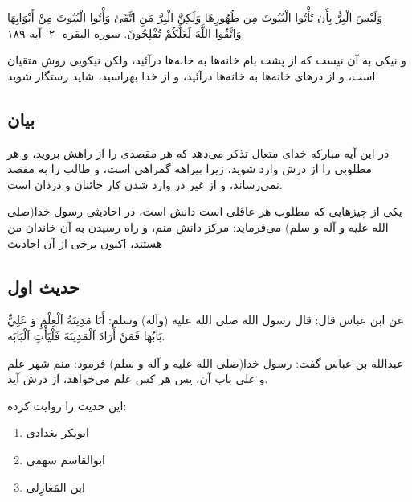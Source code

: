 وَلَيْسَ الْبِرُّ بِأَن تَأْتُوا الْبُيُوتَ مِن ظُهُورِهَا وَلَٰكِنَّ الْبِرَّ مَنِ اتَّقَىٰ وَأْتُوا الْبُيُوتَ مِنْ
أَبْوَابِهَا وَاتَّقُوا اللَّهَ لَعَلَّكُمْ تُفْلِحُونَ. سوره البقره -۲- آیه ۱۸۹.

و نیکی به آن نیست که از پشت بام خانه‌ها به خانه‌ها درآئید، ولکن نیکویی
روش متقیان است، و از درهای خانه‌ها به خانه‌ها درآئید، و از خدا بهراسید،
شاید رستگار شوید.

\subsection{بیان}

در این آیه مبارکه خدای متعال تذکر می‌دهد که هر مقصدی را از راهش بروید،
و هر مطلوبی را از درش وارد شوید، زیرا بیراهه گمراهی است، و طالب را به
مقصد نمی‌رساند، و از غیر در وارد شدن کار خائنان و دزدان است.

یکی از چیزهایی که مطلوب هر عاقلی است دانش است، در احادیثی رسول خدا(صلی
الله علیه و آله و سلم) می‌فرماید: مرکز دانش منم، و راه رسیدن به آن
خاندان من هستند، اکنون برخی از آن احادیث

\subsection{حدیث اول}

عن ابن عباس قال: قال رسول الله صلی الله علیه (وآله) وسلم: أَنَا مَدِينَةُ
اَلْعِلْمِ وَ عَلِيٌّ بَابُهَا فَمَنْ أَرَادَ اَلْمَدِينَةَ فَلْيَأْتِ اَلْبَابَه.

عبدالله بن عباس گفت: رسول خدا(صلی الله علیه و آله و سلم) فرمود: منم
شهر علم و علی باب آن، پس هر کس علم می‌خواهد، از درش آید.

این حدیث را روایت کرده:

\begin{enumerate}
\item
  ابوبکر بغدادی

\item
  ابوالقاسم سهمی

\item
  ابن المَغازِلی

\end{enumerate}
